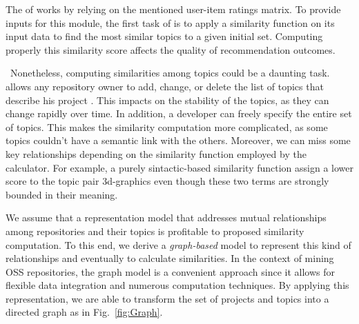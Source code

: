 %
%




The  of \CT works by relying on the mentioned user-item ratings matrix. To provide
inputs for this module, the first task of \CT is to apply a similarity function on its input data to find the
most similar topics to a given initial set. Computing properly this similarity score affects the quality of recommendation outcomes.


~Nonetheless, computing similarities among topics could be a daunting task. \GH allows any repository owner to add, change, or delete the list of topics that describe his project \cite{}. This impacts on the stability of the topics, as they can change rapidly over time. In addition, a developer can freely specify the entire set of topics. This makes the similarity computation more complicated, as some topics couldn't have a semantic link with the others. Moreover, we can miss some key relationships depending on the similarity function employed by the calculator. For example, a purely sintactic-based similarity function assign a lower score to the topic pair 3d-graphics even though these two terms are strongly bounded in their meaning. 




We assume that a representation model that addresses mutual
relationships among \GH repositories and their topics is profitable to
proposed similarity computation. To this end, we derive a
\textit{graph-based} model to represent this kind of relationships and eventually to calculate similarities. In the context of mining OSS repositories, the graph model is a convenient approach since it allows for flexible data integration and numerous computation techniques.
By applying this representation, we are able to transform the set of projects and topics 
 into a directed graph as in Fig.~\ref{fig:Graph}.

